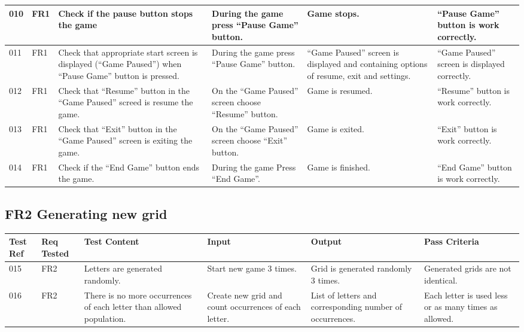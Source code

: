 \documentclass{project}
\begin{document}
\begin{longtable}{|p{0.7cm}|p{1cm}|p{3.5cm}|p{3.2cm}|p{3.5cm}|p{3.5cm}|}
010 & FR1 & Check if the pause button stops the game & During the game press “Pause Game” button. & Game stops. 
&“Pause Game” button is work correctly. \\ \hline

011 & FR1 & Check that appropriate start screen is displayed (“Game Paused”) when “Pause Game” button is pressed. 
& During the game press “Pause Game” button. & “Game Paused” screen is displayed and containing options of resume, exit and settings.
& “Game Paused” screen is displayed correctly. \\ \hline

012 & FR1 & Check that “Resume” button in the “Game Paused” screed is resume the game. & On the “Game Paused” screen choose “Resume” button.
& Game is resumed. &  “Resume” button is work correctly. \\ \hline

013 & FR1 & Check that “Exit” button in the “Game Paused” screen is exiting the game. & On the “Game Paused” screen choose “Exit” button. 
& Game is exited. & “Exit” button is work correctly. \\ \hline

014 & FR1 & Check if the “End Game” button ends the game. & During the game Press “End Game”. & Game is finished.
& “End Game” button is work correctly. \\ \hline

\end{longtable}

\subsection{FR2 Generating new grid}

\begin{longtable}{|p{0.7cm}|p{1cm}|p{3.5cm}|p{3.2cm}|p{3.5cm}|p{3.5cm}|}
\hline
Test Ref & Req Tested & Test Content & Input  & Output & Pass Criteria \\ \hline \hline


015 & FR2 & Letters are generated randomly. & Start new game 3 times. & Grid is generated randomly 3 times.
& Generated grids are not identical. \\ \hline

016 & FR2 & There is no more occurrences of each letter than allowed population. & Create new grid and count occurrences of each letter.
& List of letters and corresponding number of occurrences. & Each letter is used less or as many times as allowed. \\ \hline

\end{longtable}
\end{document}
